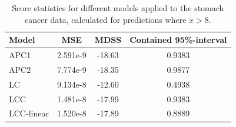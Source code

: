 \begin{table}[h!]
    \begin{center}
        \begin{tabular}{l |c c c }
            Model & MSE &   MDSS & Contained 95\%-interval\\
            \hline
            APC1    & 2.591e-9 & -18.63    & 0.9383 \\
            APC2    & 7.774e-9 & -18.35    & 0.9877 \\
            LC         & 9.134e-8 & -12.60    & 0.4938 \\
            LCC        & 1.481e-8 & -17.99    & 0.9383 \\ 
            LCC-linear & 1.520e-8 & -17.89    & 0.8889 \\
        \end{tabular}
        \caption{Score statistics for different models applied to the stomach cancer data, calculated for predictions where $x > 8$.}\label{tbl:uv-stomach-8}
    \end{center}
\end{table}


